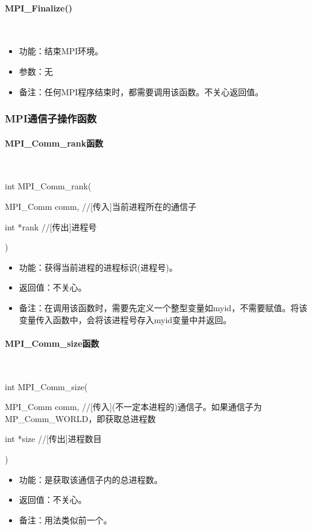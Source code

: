 \documentclass[UTF8]{article}%
\begin{document}
\paragraph{MPI\_Finalize()}~{}

\begin{itemize}
    \item 功能：结束MPI环境。
    \item 参数：无
    \item 备注：任何MPI程序结束时，都需要调用该函数。不关心返回值。
\end{itemize}

\subsubsection{MPI通信子操作函数}

\paragraph{MPI\_Comm\_rank函数}~{}

int MPI\_Comm\_rank(

    \qquad MPI\_Comm comm, //[传入]当前进程所在的通信子

    \qquad int *rank //[传出]进程号

    ) 

\begin{itemize}
    \item 功能：获得当前进程的进程标识(进程号)。
    \item 返回值：不关心。
    \item 备注：在调用该函数时，需要先定义一个整型变量如myid，不需要赋值。将该变量传入函数中，会将该进程号存入myid变量中并返回。
\end{itemize}

\paragraph{MPI\_Comm\_size函数}~{}

int MPI\_Comm\_size(
    
    \qquad MPI\_Comm comm, //[传入](不一定本进程的)通信子。如果通信子为MP\_Comm\_WORLD，即获取总进程数

    \qquad int *size //[传出]进程数目
    
    ) 

\begin{itemize}
    \item 功能：是获取该通信子内的总进程数。
    \item 返回值：不关心。
    \item 备注：用法类似前一个。
\end{itemize}
\end{document}
